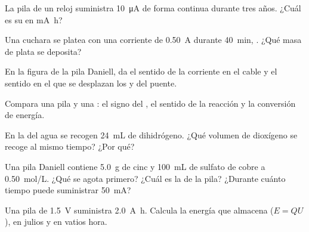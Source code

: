 \begin{exercise}[$\star\star$]\label{exo:g12:cells-and-electrolysis:7}
La pila de un reloj suministra \qty{10}{\micro A} de forma continua
durante tres años. ¿Cuál es su  en \si{mA.h}?
\end{exercise}

\begin{exercise}[$\star\star$]\label{exo:g12:cells-and-electrolysis:8}
Una cuchara se platea con una corriente de \qty{0.50}{A} durante
\qty{40}{min}, . ¿Qué masa de plata se deposita?
\end{exercise}

\begin{exercise}[$\star\star$]\label{exo:g12:cells-and-electrolysis:9}
En la figura de la pila Daniell, da el sentido de la corriente en el
cable y el sentido en el que se desplazan los   y 
del puente.
\end{exercise}

\begin{exercise}[$\star\star$]\label{exo:g12:cells-and-electrolysis:10}
Compara una pila y una : el signo del , el sentido de la
reacción y la conversión de energía.
\end{exercise}

\begin{exercise}[$\star\star$]\label{exo:g12:cells-and-electrolysis:11}
En la  del agua se recogen \qty{24}{mL} de dihidrógeno. ¿Qué
volumen de dioxígeno se recoge al mismo tiempo? ¿Por qué?
\end{exercise}

\begin{exercise}[$\star\star\star$]\label{exo:g12:cells-and-electrolysis:12}
Una pila Daniell contiene \qty{5.0}{g} de cinc y \qty{100}{mL} de sulfato
de cobre a \qty{0.50}{mol/L}. ¿Qué  se agota primero? ¿Cuál es la
 de la pila? ¿Durante cuánto tiempo puede suministrar
\qty{50}{mA}?
\end{exercise}

\begin{exercise}[$\star\star\star$]\label{exo:g12:cells-and-electrolysis:13}
Una pila de \qty{1.5}{V} suministra \qty{2.0}{A.h}. Calcula la energía
que almacena ($E = Q U$), en julios y en vatios hora.
\end{exercise}

